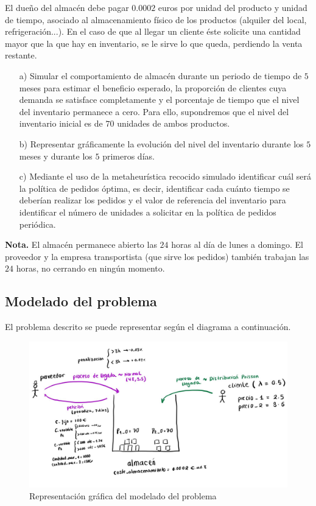\documentclass[a4paper,12pt]{article}
\begin{document}
	El dueño del almacén debe pagar $0.0002$ euros por unidad del producto y unidad de tiempo, asociado al almacenamiento físico de los productos (alquiler del local, refrigeración...). En el caso de que al llegar un cliente éste solicite una cantidad mayor que la que hay en inventario, se le sirve lo que queda, perdiendo la venta restante.
	
	\begin{enumerate}
		\item[a)] Simular el comportamiento de almacén durante un periodo de tiempo de $5$ meses para estimar el beneficio esperado, la proporción de clientes cuya demanda se satisface completamente y el porcentaje de tiempo que el nivel del inventario permanece a cero. Para ello, supondremos que el nivel del inventario inicial es de $70$ unidades de ambos productos.

		\item[b)] Representar gráficamente la evolución del nivel del inventario durante los $5$ meses y durante los $5$ primeros días. 

		\item[c)] Mediante el uso de la metaheurística recocido simulado identificar cuál será la política de pedidos óptima, es decir, identificar cada cuánto tiempo se deberían realizar los pedidos y el valor de referencia del inventario para identificar el número de unidades a solicitar en la política de pedidos periódica.
	\end{enumerate}
	
	\textbf{Nota.} El almacén permanece abierto las $24$ horas al día de lunes a domingo. El proveedor y la empresa transportista (que sirve los pedidos) también trabajan las $24$ horas, no cerrando en ningún momento.

	\subsection{Modelado del problema}
	El problema descrito se puede representar según el diagrama a continuación.
	
	\begin{figure}[H]
		\centering
		\includegraphics[width=\textwidth]{include/modelo_almacen.png}
		\caption{Representación gráfica del modelado del problema}
	\end{figure}
\end{document}
